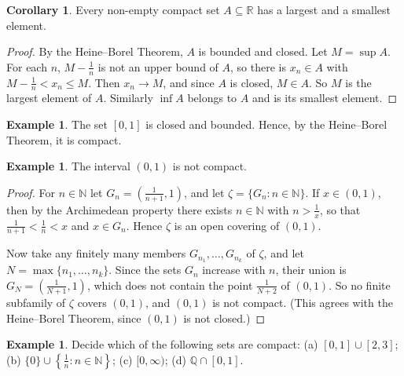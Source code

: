 \documentclass[11pt,a4paper]{article}
\numberwithin{equation}{section}
\theoremstyle{definition}
\newtheorem{exa}[thm]{Example}
\newtheorem{coro}[thm]{Corollary}
\begin{document}
\begin{coro}
Every non-empty compact set $A\subseteq \mathbb{R}$ has a largest and a smallest element.
\end{coro}

\begin{proof}
By the Heine--Borel Theorem, $A$ is bounded and closed. Let $M = \sup A$. For each $n$, $M-\frac{1}{n}$ is not an upper bound of $A$, so there is $x_n\in A$ with $M-\frac{1}{n}<x_n\leq M$. Then $x_n\longrightarrow M$, and since $A$ is closed, $M \in A$. So $M$ is the largest element of $A$. Similarly $\inf A$ belongs to $A$ and is its smallest element.
\end{proof}


\begin{exa}
The set $[0,1]$ is closed and bounded. Hence, by the Heine--Borel Theorem, it is compact.
\end{exa}


\begin{exa}
The interval $(0,1)$ is not compact.
\end{exa}

\begin{proof}
For $n\in\mathbb{N}$ let $G_n = \left(\frac{1}{n + 1}, 1\right)$, and let $\zeta = \{G_n : n\in \mathbb{N}\}$. If $x\in (0,1)$, then by the Archimedean property there exists $n \in \mathbb{N}$ with $n > \frac{1}{x}$, so that $\frac{1}{n+1} < \frac{1}{n} < x$ and $x \in G_n$. Hence $\zeta$ is an open covering of $(0,1)$.

Now take any finitely many members $G_{n_1},\dots,G_{n_k}$ of $\zeta$, and let $N = \max\{n_1,\dots,n_k\}$. Since the sets $G_n$ increase with $n$, their union is $G_N = \left(\frac{1}{N+1}, 1\right)$, which does not contain the point $\frac{1}{N + 2}$ of $(0,1)$. So no finite subfamily of $\zeta$ covers $(0,1)$, and $(0,1)$ is not compact. (This agrees with the Heine--Borel Theorem, since $(0,1)$ is not closed.)
\end{proof}

\begin{exa}
Decide which of the following sets are compact: (a) $[0,1]\cup[2,3]$; (b) $\{0\}\cup\left\{\frac{1}{n}: n\in\mathbb{N}\right\}$; (c) $[0,\infty)$; (d) $\mathbb{Q}\cap[0,1]$.
\end{exa}
\end{document}
